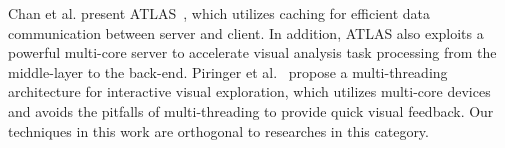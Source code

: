 Chan et al. present ATLAS~\cite{chan2008maintaining}, which utilizes caching for efficient data communication between server and client.
In addition, ATLAS also exploits a powerful multi-core server to accelerate visual analysis task processing from the middle-layer to the back-end.
Piringer et al.~\cite{piringer2009multi} propose a multi-threading architecture for interactive visual exploration,
which utilizes multi-core devices and avoids the pitfalls of multi-threading to provide quick visual feedback.
{Our} techniques in this work are orthogonal to researches in this category.

%
%
%
%
